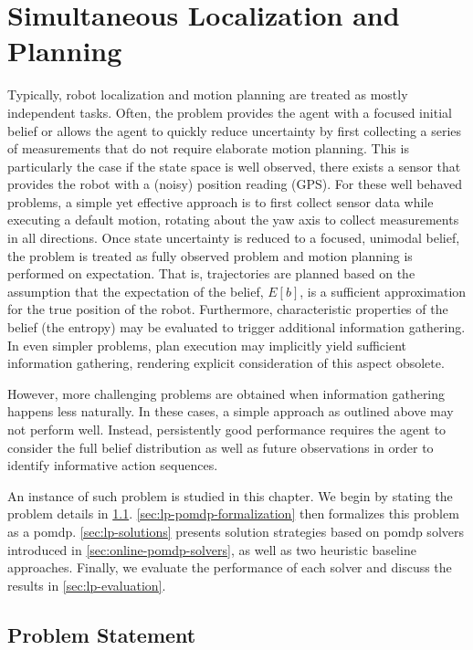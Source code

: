 \chapter{Simultaneous Localization and Planning}\label{chap:localization-and-planning}

Typically, robot localization and motion planning are treated as mostly
independent tasks. Often, the problem provides the agent with a focused initial
belief or allows the agent to quickly reduce uncertainty by first collecting
a series of measurements that do not require elaborate motion planning. This is
particularly the case if the state space is well observed, \ie there exists
a sensor that provides the robot with a (noisy) position reading (\eg GPS).
For these well behaved problems, a simple yet effective approach is to first
collect sensor data while executing a default motion, \ie rotating about the
yaw axis to collect measurements in all directions. Once state uncertainty is
reduced to a focused, unimodal belief, the problem is treated as fully observed
problem and motion planning is performed on expectation. That is, trajectories
are planned based on the assumption that the expectation of the belief, $E[b]$,
is a sufficient approximation for the true position of the robot. Furthermore,
characteristic properties of the belief (\eg the entropy) may be evaluated
to trigger additional information gathering. In even simpler problems, plan
execution may implicitly yield sufficient information gathering, rendering
explicit consideration of this aspect obsolete.

However, more challenging problems are obtained when information gathering
happens less naturally. In these cases, a simple approach as outlined above
may not perform well. Instead, persistently good performance requires the agent
to consider the full belief distribution as well as future observations in
order to identify informative action sequences.

An instance of such problem is studied in this chapter. We begin by stating the
problem details in \cref{sec:lp-problem-statement}.
\cref{sec:lp-pomdp-formalization} then formalizes this problem as a \ac{pomdp}.
\cref{sec:lp-solutions} presents solution strategies based on \ac{pomdp}
solvers introduced in \cref{sec:online-pomdp-solvers}, as well as two heuristic
baseline approaches. Finally, we evaluate the performance of each solver and
discuss the results in \cref{sec:lp-evaluation}.

\section{Problem Statement}\label{sec:lp-problem-statement}

